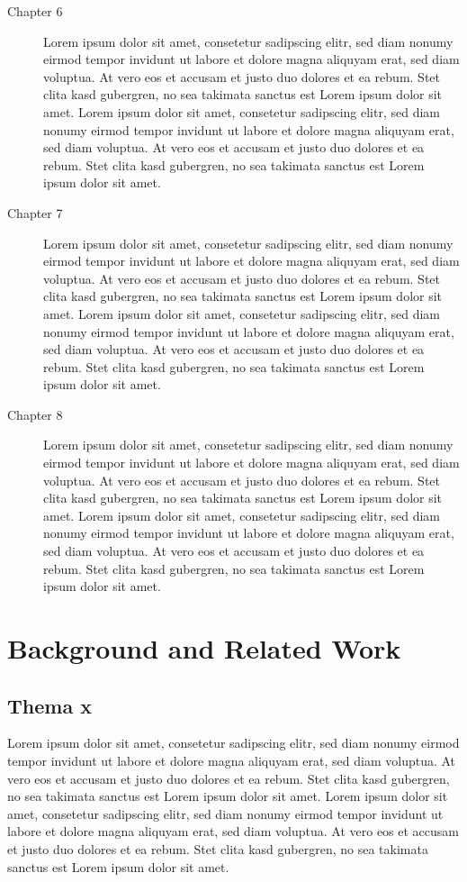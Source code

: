 \documentclass[11pt,oneside,a4paper]{book}
\begin{document}
\begin{description}
\item[Chapter 6] Lorem ipsum dolor sit amet, consetetur sadipscing elitr, sed diam nonumy eirmod tempor invidunt ut labore et dolore magna aliquyam erat, sed diam voluptua. At vero eos et accusam et justo duo dolores et ea rebum. Stet clita kasd gubergren, no sea takimata sanctus est Lorem ipsum dolor sit amet. Lorem ipsum dolor sit amet, consetetur sadipscing elitr, sed diam nonumy eirmod tempor invidunt ut labore et dolore magna aliquyam erat, sed diam voluptua. At vero eos et accusam et justo duo dolores et ea rebum. Stet clita kasd gubergren, no sea takimata sanctus est Lorem ipsum dolor sit amet.

\item[Chapter 7] Lorem ipsum dolor sit amet, consetetur sadipscing elitr, sed diam nonumy eirmod tempor invidunt ut labore et dolore magna aliquyam erat, sed diam voluptua. At vero eos et accusam et justo duo dolores et ea rebum. Stet clita kasd gubergren, no sea takimata sanctus est Lorem ipsum dolor sit amet. Lorem ipsum dolor sit amet, consetetur sadipscing elitr, sed diam nonumy eirmod tempor invidunt ut labore et dolore magna aliquyam erat, sed diam voluptua. At vero eos et accusam et justo duo dolores et ea rebum. Stet clita kasd gubergren, no sea takimata sanctus est Lorem ipsum dolor sit amet.

\item[Chapter 8] Lorem ipsum dolor sit amet, consetetur sadipscing elitr, sed diam nonumy eirmod tempor invidunt ut labore et dolore magna aliquyam erat, sed diam voluptua. At vero eos et accusam et justo duo dolores et ea rebum. Stet clita kasd gubergren, no sea takimata sanctus est Lorem ipsum dolor sit amet. Lorem ipsum dolor sit amet, consetetur sadipscing elitr, sed diam nonumy eirmod tempor invidunt ut labore et dolore magna aliquyam erat, sed diam voluptua. At vero eos et accusam et justo duo dolores et ea rebum. Stet clita kasd gubergren, no sea takimata sanctus est Lorem ipsum dolor sit amet.

\end{description}
\chapter{Background and Related Work}


\section{Thema x}
Lorem ipsum dolor sit amet, consetetur sadipscing elitr, sed diam nonumy eirmod tempor invidunt ut labore et dolore magna aliquyam erat, sed diam voluptua. At vero eos et accusam et justo duo dolores et ea rebum. Stet clita kasd gubergren, no sea takimata sanctus est Lorem ipsum dolor sit amet. Lorem ipsum dolor sit amet, consetetur sadipscing elitr, sed diam nonumy eirmod tempor invidunt ut labore et dolore magna aliquyam erat, sed diam voluptua. At vero eos et accusam et justo duo dolores et ea rebum. Stet clita kasd gubergren, no sea takimata sanctus est Lorem ipsum dolor sit amet.
\end{document}
